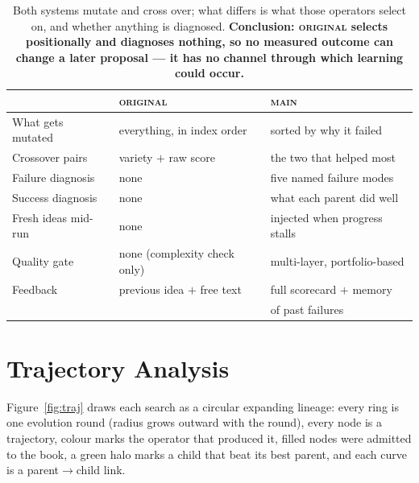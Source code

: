 \documentclass[11pt]{article}
\newcommand{\main}{\textsc{main}}
\newcommand{\orig}{\textsc{original}}
\begin{document}
\begin{table}[h]
\centering\small
\begin{tabular}{lll}
\toprule
 & \orig{} & \main{} \\
\midrule
What gets mutated   & everything, in index order & sorted by why it failed \\[0.2em]
Crossover pairs     & variety $+$ raw score & the two that helped most \\[0.2em]
Failure diagnosis   & none & five named failure modes \\[0.2em]
Success diagnosis   & none & what each parent did well \\[0.2em]
Fresh ideas mid-run & none & injected when progress stalls \\[0.2em]
Quality gate        & none (complexity check only) & multi-layer, portfolio-based \\[0.2em]
Feedback            & previous idea $+$ free text & full scorecard $+$ memory \\
                    &  & of past failures \\
\bottomrule
\end{tabular}
\caption{Both systems mutate and cross over; what differs is what those operators
select on, and whether anything is diagnosed. \textbf{Conclusion: \orig{} selects
positionally and diagnoses nothing, so no measured outcome can change a later proposal
--- it has no channel through which learning could occur.}}
\label{tab:mechanisms}
\end{table}

\section{Trajectory Analysis}
\label{sec:trajectory}

Figure~\ref{fig:traj} draws each search as a circular expanding lineage: every ring
is one evolution round (radius grows outward with the round), every node is a
trajectory, colour marks the operator that produced it, filled nodes were admitted
to the book, a green halo marks a child that beat its best parent, and each curve is
a parent$\rightarrow$child link.
\end{document}
